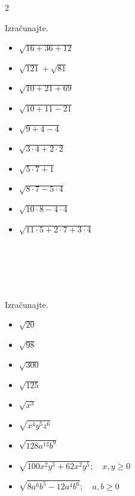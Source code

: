 \begin{multicols}{2}
        
            \begin{naloga}
                Izračunajte.
                \begin{itemize}
                        \item $\sqrt{16+36+12}$ 
                        \item $\sqrt{121}+\sqrt{81}$ 
                        \item $\sqrt{10+21+69}$ 
                        \item $\sqrt{10+11-21}$ 
                        \item $\sqrt{9+4-4}$ 
                        \item $\sqrt{3\cdot 4+2\cdot 2}$ 
                        \item $\sqrt{5\cdot 7 +1}$ 
                        \item $\sqrt{8\cdot 7-5\cdot 4}$ 
                        \item $\sqrt{10\cdot 8-4\cdot 4}$ 
                        \item $\sqrt{11\cdot 5+2\cdot 7+3\cdot 4}$ 
                \end{itemize}
            \end{naloga}
        
            ~~~~\\~\\~\\~\\
        
            \begin{naloga}
                Izračunajte.
                \begin{itemize}
                        \item $\sqrt{20}$ 
                        \item $\sqrt{98}$ 
                        \item $\sqrt{300}$ 
                        \item $\sqrt{125}$ 
                        \item $\sqrt{x^3}$ 
                        \item $\sqrt{x^4y^5z^6}$ 
                        \item $\sqrt{128a^{13}b^9}$ 
                        \item $\sqrt{100x^2y^5+62x^2y^5}; \quad x,y\geq 0$ 
                        \item $\sqrt{8a^6b^5-12a^4b^6}; \quad a,b\geq 0$ 
                \end{itemize}
            \end{naloga}
        



\end{multicols}
